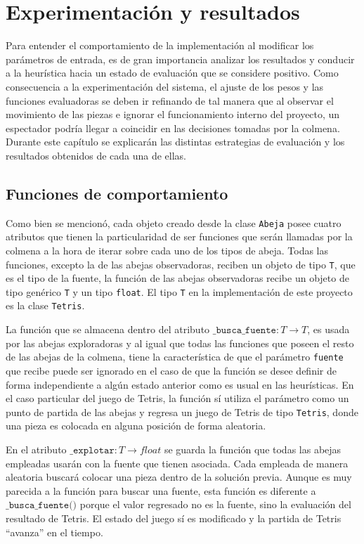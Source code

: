 \chapter{Experimentación y resultados}

Para entender el comportamiento de la implementación al modificar los parámetros de 
entrada, es de gran importancia analizar los resultados y conducir a la heurística 
hacia un estado de evaluación que se considere positivo. Como consecuencia a 
la experimentación del sistema, el ajuste de los pesos y las funciones evaluadoras se deben 
ir refinando de tal manera que 
al observar el movimiento de las piezas e ignorar el funcionamiento interno 
del proyecto, un espectador podría llegar a coincidir en las decisiones tomadas 
por la colmena. Durante este capítulo se explicarán las distintas estrategias 
de evaluación y los resultados obtenidos de cada una de ellas.

\section{Funciones de comportamiento}

Como bien se mencionó, cada objeto creado desde la clase 
\texttt{Abeja} posee cuatro atributos que tienen 
la particularidad de ser funciones que serán llamadas por la colmena a la hora de 
iterar sobre cada uno de los tipos de abeja. Todas las funciones, excepto la de las 
abejas observadoras, reciben un objeto 
de tipo \texttt{T}, que es el tipo de la fuente, la función de las abejas 
observadoras recibe un objeto de tipo genérico \texttt{T} y un tipo \texttt{float}. 
El tipo \texttt{T} en la implementación de este proyecto es la clase \texttt{Tetris}.

La función que se almacena dentro del atributo 
$\texttt{\_busca\_fuente}:T \rightarrow T$, 
es usada por las abejas exploradoras y al igual que todas las funciones que poseen 
el resto de las abejas de la colmena, tiene la característica de que el parámetro 
\texttt{fuente} que recibe puede ser ignorado en el caso de que la función se desee 
definir de forma independiente a algún estado anterior como es usual en las heurísticas. 
En el caso particular del juego de Tetris, la función sí utiliza el parámetro 
como un punto de partida de las abejas y regresa un juego de Tetris de tipo 
\texttt{Tetris}, donde una pieza es colocada en alguna posición de forma aleatoria.

En el atributo $\texttt{\_explotar}:T\rightarrow float$ se guarda la función 
que todas las abejas empleadas usarán con la fuente que tienen asociada. 
Cada empleada de manera aleatoria buscará colocar una pieza dentro de la solución 
previa. Aunque es muy parecida a la función para buscar una fuente,  
esta función es diferente a $\texttt{\_busca\_fuente()}$ porque 
el valor regresado no es la fuente, sino la evaluación del resultado de Tetris. 
El estado del juego sí es modificado y la partida de Tetris ``avanza'' en el tiempo.

